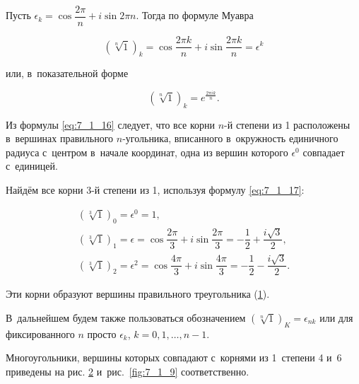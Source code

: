 \noindent
Пусть $\epsilon_{k} = \cos \dfrac{2\pi}{n} + i \sin{2\pi}{n}$.
Тогда по формуле Муавра

\begin{equation}\label{eq:7_1_17}
\left( \sqrt[\scriptstyle n]{1} \right)_{k} = 
\cos \dfrac{2\pi k}{n} + i \sin \dfrac{2\pi k}{n} =
\epsilon^{k}
\end{equation}

\noindent
или, в~показательной форме

\begin{equation}\label{eq:7_1_18}
\left( \sqrt[\scriptstyle n]{1} \right)_{k} = e^{\frac{2\pi i k}{n}}.
\end{equation}

Из формулы \eqref{eq:7_1_16} следует, что все корни $n$-й степени из 1 расположены
в~вершинах правильного $n$-угольника, вписанного в~окружность единичного радиуса
с~центром в~начале координат, одна из вершин которого $\epsilon^{0}$ совпадает
с~единицей.

Найдём все корни 3-й степени из 1, используя формулу \eqref{eq:7_1_17}:

\begin{gather*}
\left( \sqrt[\scriptstyle 3]{1} \right)_{0} = \epsilon^{0} = 1, \\
\left( \sqrt[\scriptstyle 3]{1} \right)_{1} = \epsilon
= \cos \dfrac{2\pi}{3} + i\sin \dfrac{2\pi}{3}
= -\dfrac{1}{2} + \dfrac{i\sqrt{3}}{2}, \\
\left( \sqrt[\scriptstyle 3]{1} \right)_{2} = \epsilon^{2}
= \cos \dfrac{4\pi}{3} + i\sin \dfrac{4\pi}{3}
= -\dfrac{1}{2} - \dfrac{i\sqrt{3}}{2}.
\end{gather*}

Эти корни образуют вершины правильного треугольника (\ref{fig:7_1_7}).

\begin{figure}\label{fig:7_1_7}
\end{figure}

\noindent
В~дальнейшем будем также пользоваться обозначением
$\left( \sqrt[n]{1} \right)_{K} = \epsilon_{nk}$ или для фиксированного $n$ просто
$\epsilon_{k}$, $k = 0, 1, \dots, n-1$.

Многоугольники, вершины которых совпадают с~корнями из 1~степени 4 и~6 приведены
на рис. \ref{fig:7_1_8} и~рис.\ \ref{fig:7_1_9} соответственно.

\begin{figure}\label{fig:7_1_8}
\end{figure}

